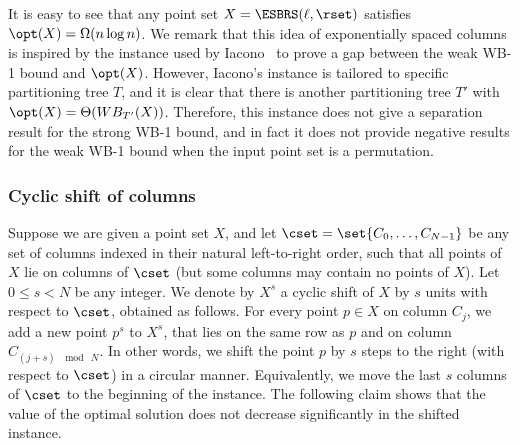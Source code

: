 It is easy to see that any point set $X= \ESBRS(\ell, \rset)$ satisfies $\opt(X) = \Omega(n \log n)$.  
We remark that this idea of exponentially spaced columns is inspired by the instance used by Iacono~\cite{in_pursuit} to prove a gap between the weak WB-1 bound and $\opt(X)$.  
However, Iacono's instance is tailored to specific partitioning tree $T$, and it is clear that there is another partitioning tree $T'$ with $\opt(X) = \Theta(WB_{T'}(X))$.
Therefore, this instance does not give a separation result for the strong WB-1 bound, and in fact it does not provide negative results for the weak WB-1 bound when the input point set is a permutation.    



\subsubsection{Cyclic shift of columns}


Suppose we are given a point set $X$, and let $\cset=\set{C_0,\ldots,C_{N-1}}$ be any set of columns indexed in their natural left-to-right order, such that all points of $X$ lie on columns of $\cset$ (but some columns may contain no points of $X$).
Let $0\leq s<N$ be any integer. We denote by $X^s$ a cyclic shift of $X$ by $s$ units with respect to $\cset$, obtained as follows. 
For every point $p\in X$ on column $C_j$, we add a new point $p^s$ to $X^s$, that lies on the same row as $p$ and on column $C_{(j+s)~\mod~N}$.  
In other words, we shift the point $p$ by $s$ steps to the right (with respect to $\cset$) in a circular manner. Equivalently, we move the last $s$ columns of $\cset$ to the beginning of the instance.
The following claim shows that the value of the optimal solution does not decrease significantly in the shifted instance.

